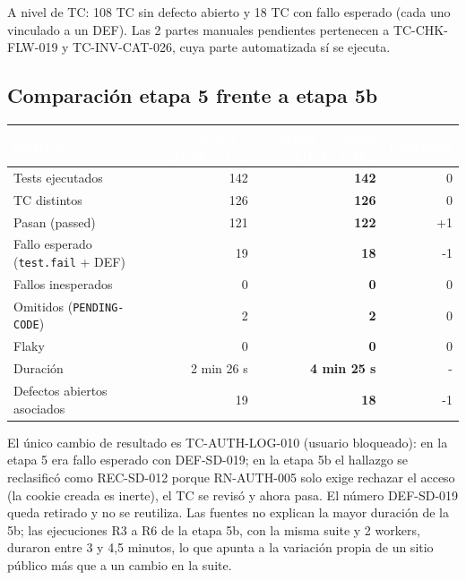 \documentclass[10pt,a4paper]{article}
\newcommand{\tabhead}{\rowcolor{primary}}
\newcommand{\hcell}[1]{\textcolor{white}{\bfseries #1}}
\newcommand{\zebrarows}{\rowcolors{2}{zebra}{white}}
\begin{document}
A nivel de TC: 108 TC sin defecto abierto y 18 TC con fallo esperado (cada uno vinculado a un DEF). Las 2 partes manuales pendientes pertenecen a TC-CHK-FLW-019 y TC-INV-CAT-026, cuya parte automatizada sí se ejecuta.

\subsection{Comparación etapa 5 frente a etapa 5b}
{\zebrarows
\begin{tabularx}{\textwidth}{|Y|r|r|r|}
\hline
\tabhead \hcell{Métrica} & \hcell{Etapa 5 (15:58 UTC)} & \hcell{Etapa 5b oficial (16:47 UTC)} & \hcell{Diferencia} \\ \hline
Tests ejecutados & 142 & \textbf{142} & 0 \\ \hline
TC distintos & 126 & \textbf{126} & 0 \\ \hline
Pasan (passed) & 121 & \textbf{122} & +1 \\ \hline
Fallo esperado (\texttt{test.fail} + DEF) & 19 & \textbf{18} & -1 \\ \hline
Fallos inesperados & 0 & \textbf{0} & 0 \\ \hline
Omitidos (\texttt{PENDING-CODE}) & 2 & \textbf{2} & 0 \\ \hline
Flaky & 0 & \textbf{0} & 0 \\ \hline
Duración & 2 min 26 s & \textbf{4 min 25 s} & - \\ \hline
Defectos abiertos asociados & 19 & \textbf{18} & -1 \\ \hline
\end{tabularx}}

El único cambio de resultado es TC-AUTH-LOG-010 (usuario bloqueado): en la etapa 5 era fallo esperado con DEF-SD-019; en la etapa 5b el hallazgo se reclasificó como REC-SD-012 porque RN-AUTH-005 solo exige rechazar el acceso (la cookie creada es inerte), el TC se revisó y ahora pasa. El número DEF-SD-019 queda retirado y no se reutiliza. Las fuentes no explican la mayor duración de la 5b; las ejecuciones R3 a R6 de la etapa 5b, con la misma suite y 2 workers, duraron entre 3 y 4,5 minutos, lo que apunta a la variación propia de un sitio público más que a un cambio en la suite.
\end{document}
